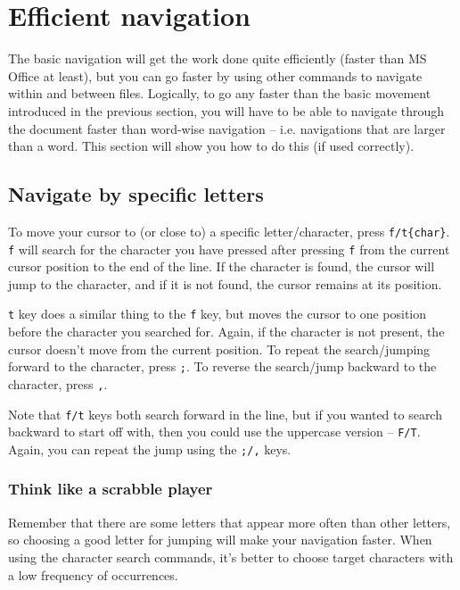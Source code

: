 \section{Efficient navigation}

The basic navigation will get the work done quite efficiently (faster than MS Office at least), but you can go faster by using other commands to navigate within and between files.
Logically, to go any faster than the basic movement introduced in the previous section, you will have to be able to navigate through the document faster than word-wise navigation -- i.e. navigations that are larger than a word.
This section will show you how to do this (if used correctly).

\subsection{Navigate by specific letters}

To move your cursor to (or close to) a specific letter/character, press \verb|f/t{char}|.
\verb|f| will search for the character you have pressed after pressing \verb|f| from the current cursor position to the end of the line.
If the character is found, the cursor will jump to the character, and if it is not found, the cursor remains at its position.

\verb|t| key does a similar thing to the \verb|f| key, but moves the cursor to one position before the character you searched for.
Again, if the character is not present, the cursor doesn't move from the current position.
To repeat the search/jumping forward to the character, press \verb|;|.
To reverse the search/jump backward to the character, press \verb|,|.

Note that \verb|f/t| keys  both search forward in the line, but if you wanted to search backward to start off with, then you could use the uppercase version -- \verb|F/T|.
Again, you can repeat the jump using the \verb|;/,| keys.

\subsubsection{Think like a scrabble player}

Remember that there are some letters that appear more often than other letters, so choosing a good letter for jumping will make your navigation faster.
When using the character search commands, it's better to choose target characters with a low frequency of occurrences.

